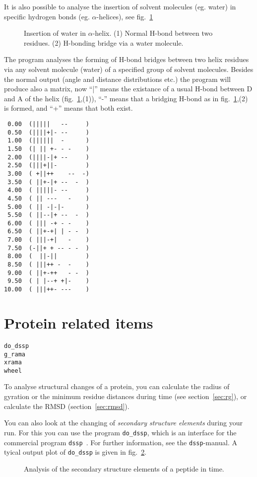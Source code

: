 It is also possible to analyse the insertion of solvent molecules (eg. water) 
in specific hydrogen bonds (eg. $\alpha$-helices), see fig.~\ref{fig:insert}
\begin{figure}
\centerline{
{}}
\caption[Insertion of water in $\alpha$-helix.]{Insertion of water in $\alpha$-helix. (1) Normal H-bond between two residues. (2) H-bonding bridge via a water molecule.}
\label{fig:insert}
\end{figure}
The program analyses the forming of H-bond bridges between two helix residues 
via any solvent molecule (water) of a specified group of solvent molecules. 
Besides the normal output (angle and distance distributions etc.) the program 
will produce also a matrix, now ``|'' means the existance of a usual H-bond 
between D and A of the helix (fig.~\ref{fig:insert},(1)), ``-'' means that a bridging H-bond as 
in fig.~\ref{fig:insert},(2) is formed, and ``+'' means that both exist.
{\small 
\begin{verbatim}
 0.00  (|||||   --     )
 0.50  (||||+|- --     )
 1.00  (||||||  -      )
 1.50  (| || +- - -    )
 2.00  (||||-|+ --     )
 2.50  (|||+||-        )
 3.00  ( +||++    --  -)
 3.50  ( ||+-|+ --  -  )
 4.00  ( |||||- --     )
 4.50  ( || ---   -    )
 5.00  ( || -|-|-      )
 5.50  ( ||--|+ --  -  )
 6.00  ( ||| -+ - -    )
 6.50  ( ||+-+| | - -  )
 7.00  ( |||-+|   -    )
 7.50  (-||+ + -- - -  )
 8.00  (  ||-||        )
 8.50  ( |||++ -  -    )
 9.00  ( ||+-++   - -  )
 9.50  ( | |--+ +|-    )
10.00  ( |||++- ---    )
\end{verbatim} } 
%
%
%
\section{Protein related items}
\begin{verbatim}
do_dssp
g_rama
xrama
wheel
\end{verbatim}
To analyse structural changes of a protein, you can calculate the radius of 
gyration or the minimum residue distances during time 
(see section~\ref{sec:rg}), or calculate the RMSD (section~\ref{sec:rmsd}).

You can also look at the changing of {\em secondary structure elements} 
during your run. For this you can use the program {\tt do\_dssp}, which is 
an interface for the commercial program {\tt dssp}~\cite{Kabsch83}. For 
further information, see the {\tt dssp}-manual. A tyical output plot of 
{\tt do\_dssp} is given in fig.~\ref{fig:dssp}.
%
\begin{figure}
\centerline{
}
\caption{Analysis of the secondary structure elements of a peptide in time.}
\label{fig:dssp}
\end{figure}
%

